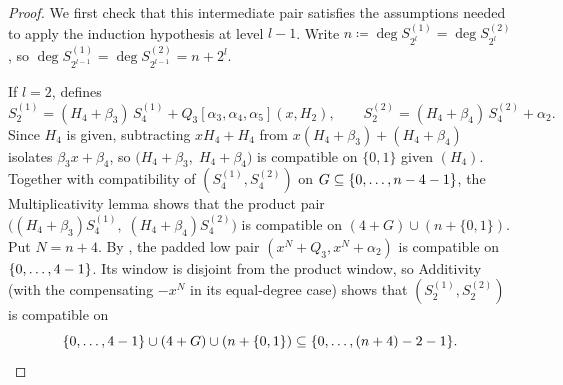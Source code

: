 \begin{proof}
    We first check that this intermediate pair satisfies the assumptions needed to apply the induction hypothesis at level $l-1$.
    Write $n\coloneqq\deg S^{(1)}_{2^l}=\deg S^{(2)}_{2^l}$, so $\deg S^{(1)}_{2^{l-1}}=\deg S^{(2)}_{2^{l-1}}=n+2^l$.

    If $l=2$,  defines
    \[
      S^{(1)}_{2}=(H_{4}+\beta_3)\,S^{(1)}_{4}+Q_{3}[\alpha_3,\alpha_4,\alpha_5](x,H_2),
      \qquad
      S^{(2)}_{2}=(H_{4}+\beta_4)\,S^{(2)}_{4}+\alpha_2.
    \]
    Since $H_4$ is given, subtracting $xH_4+H_4$ from $x(H_4+\beta_3)+(H_4+\beta_4)$ isolates $\beta_3x+\beta_4$, so $\bigl(H_4+\beta_3,\;H_4+\beta_4\bigr)$ is compatible on $\{0,1\}$ given $(H_4)$.
    Together with compatibility of $(S^{(1)}_{4},S^{(2)}_{4})$ on $G\subseteq\{0,\dotsc,n-4-1\}$, the Multiplicativity lemma shows that the product pair
    \(
      \bigl((H_{4}+\beta_3)S^{(1)}_{4},\;(H_{4}+\beta_4)S^{(2)}_{4}\bigr)
    \)
    is compatible on $(4+G)\cup(n+\{0,1\})$.
    Put $N=n+4$.  By , the padded low pair
    $(x^N+Q_3,x^N+\alpha_2)$ is compatible on $\{0,\dotsc,4-1\}$.  Its window is
    disjoint from the product window, so Additivity (with the compensating
    $-x^N$ in its equal-degree case) shows that
    $(S^{(1)}_2,S^{(2)}_2)$ is compatible on
    \[
      \{0,\dotsc,4-1\}\cup(4+G)\cup(n+\{0,1\})\subseteq\{0,\dotsc,(n+4)-2-1\}.
    \]


\end{proof}
